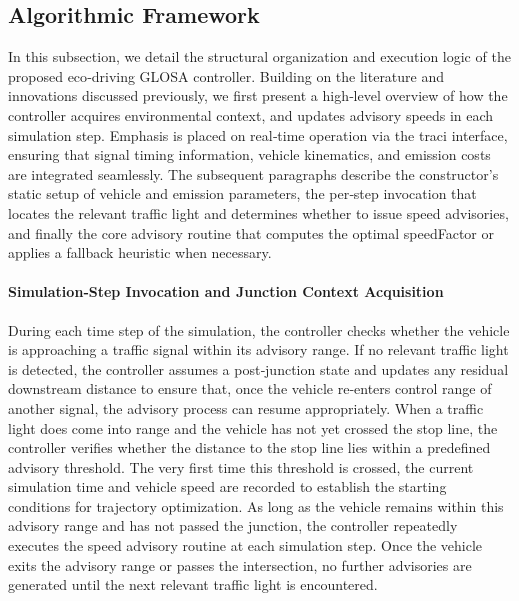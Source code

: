 \subsection{Algorithmic Framework}
\label{sec:EcoGlosa_Framework}

In this subsection, we detail the structural organization and execution logic of the proposed eco‐driving GLOSA controller. Building on the literature and innovations discussed previously, we first present a high‐level overview of how the controller acquires environmental context, and updates advisory speeds in each simulation step. Emphasis is placed on real‐time operation via the \ac{traci} interface, ensuring that signal timing information, vehicle kinematics, and emission costs are integrated seamlessly. The subsequent paragraphs describe the constructor’s static setup of vehicle and emission parameters, the per‐step invocation that locates the relevant traffic light and determines whether to issue speed advisories, and finally the core advisory routine that computes the optimal speedFactor or applies a fallback heuristic when necessary.

\paragraph{Simulation‐Step Invocation and Junction Context Acquisition} 
During each time step of the simulation, the controller checks whether the vehicle is approaching a traffic signal within its advisory range. If no relevant traffic light is detected, the controller assumes a post‐junction state and updates any residual downstream distance to ensure that, once the vehicle re‐enters control range of another signal, the advisory process can resume appropriately. When a traffic light does come into range and the vehicle has not yet crossed the stop line, the controller verifies whether the distance to the stop line lies within a predefined advisory threshold. The very first time this threshold is crossed, the current simulation time and vehicle speed are recorded to establish the starting conditions for trajectory optimization. As long as the vehicle remains within this advisory range and has not passed the junction, the controller repeatedly executes the speed advisory routine at each simulation step. Once the vehicle exits the advisory range or passes the intersection, no further advisories are generated until the next relevant traffic light is encountered.

